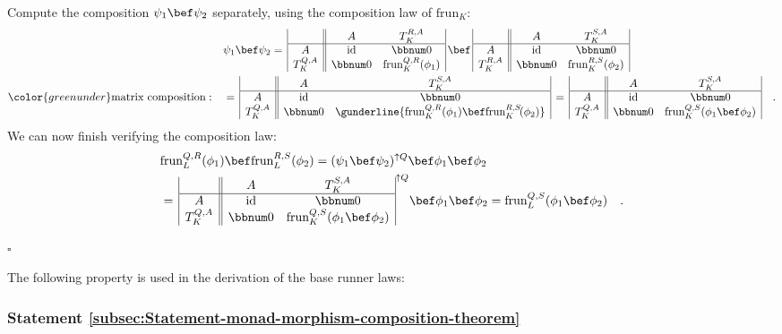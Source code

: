 Compute the composition $\psi_{1}\bef\psi_{2}$ separately, using
the composition law of $\text{frun}_{K}$:
\begin{align*}
 & \psi_{1}\bef\psi_{2}=\,\begin{array}{|c||cc|}
 & A & T_{K}^{R,A}\\
\hline A & \text{id} & \bbnum 0\\
T_{K}^{Q,A} & \bbnum 0 & \text{frun}_{K}^{Q,R}(\phi_{1})
\end{array}\,\bef\,\begin{array}{|c||cc|}
 & A & T_{K}^{S,A}\\
\hline A & \text{id} & \bbnum 0\\
T_{K}^{R,A} & \bbnum 0 & \text{frun}_{K}^{R,S}(\phi_{2})
\end{array}\\
{\color{greenunder}\text{matrix composition}:}\quad & =\,\begin{array}{|c||cc|}
 & A & T_{K}^{S,A}\\
\hline A & \text{id} & \bbnum 0\\
T_{K}^{Q,A} & \bbnum 0 & \gunderline{\text{frun}_{K}^{Q,R}(\phi_{1})\bef\text{frun}_{K}^{R,S}\!(\phi_{2})}
\end{array}\,=\,\begin{array}{|c||cc|}
 & A & T_{K}^{S,A}\\
\hline A & \text{id} & \bbnum 0\\
T_{K}^{Q,A} & \bbnum 0 & \text{frun}_{K}^{Q,S}(\phi_{1}\bef\phi_{2})
\end{array}\quad.
\end{align*}
We can now finish verifying the composition law:
\begin{align*}
 & \text{frun}_{L}^{Q,R}(\phi_{1})\bef\text{frun}_{L}^{R,S}(\phi_{2})=(\psi_{1}\bef\psi_{2})^{\uparrow Q}\bef\phi_{1}\bef\phi_{2}\\
 & =\,\begin{array}{|c||cc|}
 & A & T_{K}^{S,A}\\
\hline A & \text{id} & \bbnum 0\\
T_{K}^{Q,A} & \bbnum 0 & \text{frun}_{K}^{Q,S}(\phi_{1}\bef\phi_{2})
\end{array}^{\uparrow Q}\bef\phi_{1}\bef\phi_{2}=\text{frun}_{L}^{Q,S}(\phi_{1}\bef\phi_{2})\quad.
\end{align*}

$\square$

The following property is used in the derivation of the base runner
laws:

\subsubsection{Statement \label{subsec:Statement-monad-morphism-composition-theorem}\ref{subsec:Statement-monad-morphism-composition-theorem}}


